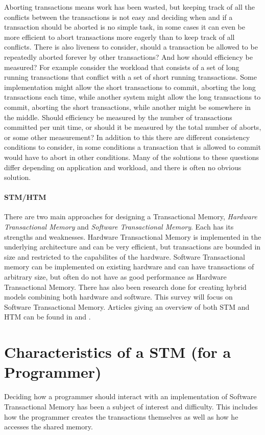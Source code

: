 Aborting transactions means work has been wasted, but keeping track of all the conflicts between the transactions is not easy and deciding when and if a transaction should be aborted is no simple task, in some cases it can even be more efficient to abort transactions more eagerly than to keep track of all conflicts.
There is also liveness to consider, should a transaction be allowed to be repeatedly aborted forever by other transactions?
And how should efficiency be measured?  For example consider the workload that consists of a set of long running transactions that conflict with a set of short running transactions.
Some implementation might allow the short transactions to commit, aborting the long transactions each time, while another system might allow the long transactions to commit, aborting the short transactions, while another might be somewhere in the middle.
Should efficiency be measured by the number of transactions committed per unit time, or should it be measured by the total number of aborts, or some other measurement?
In addition to this there are different consistency conditions to consider, in some conditions a transaction that is allowed to commit would have to abort in other conditions.
Many of the solutions to these questions differ depending on application and workload, and there is often no obvious solution.

\paragraph{STM/HTM}
There are two main approaches for designing a Transactional Memory, \emph{Hardware Transactional Memory} and \emph{Software Transactional Memory}.
Each has its strengths and weaknesses.
Hardware Transactional Memory is implemented in the underlying architecture and can be very efficient, but transactions are bounded in size and restricted to the capabilites of the hardware.
Software Transactional memory can be implemented on existing hardware and can have transactions of arbitrary size, but often do not have as good performance as Hardware Transactional Memory.
There has also been research done for creating hybrid models combining both hardware and software.
This survey will focus on Software Transactional Memory.
Articles giving an overview of both STM and HTM can be found in \cite{10.1109/MM.2007.63} and \cite{1364800}.

\section{Characteristics of a STM (for a Programmer)}
Deciding how a programmer should interact with an implementation of Software Transactional Memory has been a subject of interest and difficulty.
This includes how the programmer creates the transactions themselves as well as how he accesses the shared memory.

